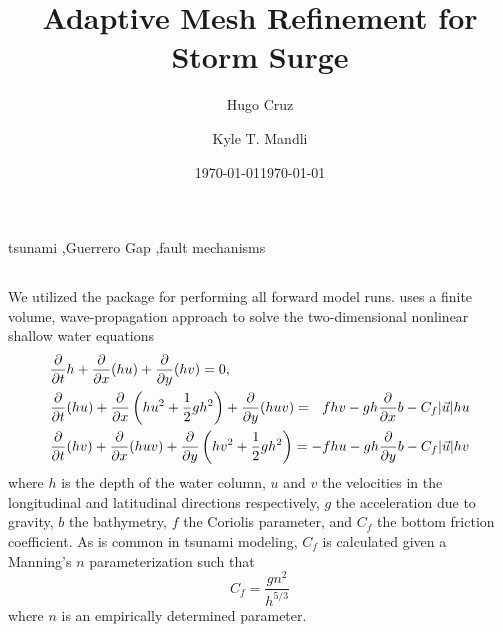 \documentclass[preprint,review,12pt]{elsarticle}
\begin{document}
\ifpdf
{}
\else
{}
\fi

\begin{frontmatter}

\title{Adaptive Mesh Refinement for Storm Surge}

\author[KAUST]{Hugo Cruz}
\author[ut]{Kyle T. Mandli}


\date{\today}
\address[KAUST]{Something}
\address[ut]{Institute for Computational Engineering and Science, University of Texas at Austin, 201 E 24th ST. Stop C0200, Austin, TX 78712-1229, USA}

\date{\today}

\begin{abstract}

\end{abstract}

\begin{keyword}
tsunami \sep Guerrero Gap \sep fault mechanisms
\end{keyword}

\end{frontmatter}
\linenumbers


\subsection{\geoclaw}

We utilized the \geoclaw package for performing all forward model runs.  \geoclaw uses a finite volume, wave-propagation approach to solve the two-dimensional nonlinear shallow water equations
\begin{equation} \label{eq:swe}
    \begin{aligned}
    &\frac{\partial }{\partial t} h + \frac{\partial }{\partial x} (hu) + \frac{\partial }{\partial y} (hv) = 0, \\
    &\frac{\partial }{\partial t}(hu) + \frac{\partial }{\partial x} \left(hu^2 + \frac{1}{2} g h^2 \right ) + \frac{\partial }{\partial y} (huv) = ~~ fhv - gh \frac{\partial }{\partial x} b - C_f |\vec{u}| hu \\
    &\frac{\partial }{\partial t} (hv) + \frac{\partial }{\partial x} (huv) + \frac{\partial }{\partial y} \left (hv^2 + \frac{1}{2} gh^2 \right) = -fhu - gh \frac{\partial }{\partial y} b - C_f |\vec{u}| hv
    \end{aligned}
\end{equation}
where $h$ is the depth of the water column, $u$ and $v$ the velocities in the longitudinal and latitudinal directions respectively, $g$ the acceleration due to gravity, $b$ the bathymetry, $f$ the Coriolis parameter, and $C_f$ the bottom friction coefficient.  As is common in tsunami modeling, $C_f$ is calculated given a Manning's $n$ parameterization such that
\begin{equation}
    C_f = \frac{g n^2}{h^{5/3}}
\end{equation}
where $n$ is an empirically determined parameter.
\end{document}
